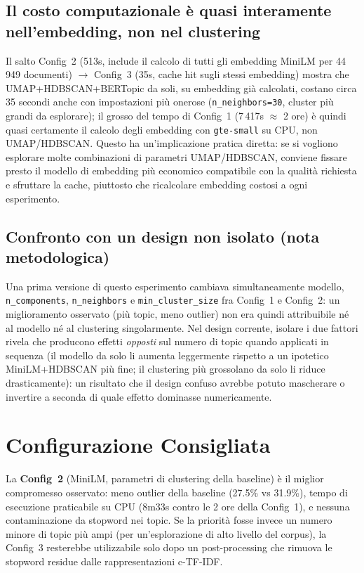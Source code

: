 \documentclass[12pt,a4paper]{article}
\begin{document}
\subsection{Il costo computazionale \`e quasi interamente nell'embedding, non nel clustering}

Il salto Config~2 (513s, include il calcolo di tutti gli embedding MiniLM per 44\,949 documenti) $\to$ Config~3 (35s, cache hit sugli stessi embedding) mostra che UMAP+HDBSCAN+BERTopic da soli, su embedding gi\`a calcolati, costano circa 35 secondi anche con impostazioni pi\`u onerose (\texttt{n\_neighbors=30}, cluster pi\`u grandi da esplorare); il grosso del tempo di Config~1 (7\,417s $\approx$ 2 ore) \`e quindi quasi certamente il calcolo degli embedding con \texttt{gte-small} su CPU, non UMAP/HDBSCAN. Questo ha un'implicazione pratica diretta: se si vogliono esplorare molte combinazioni di parametri UMAP/HDBSCAN, conviene fissare presto il modello di embedding pi\`u economico compatibile con la qualit\`a richiesta e sfruttare la cache, piuttosto che ricalcolare embedding costosi a ogni esperimento.

\subsection{Confronto con un design non isolato (nota metodologica)}

Una prima versione di questo esperimento cambiava simultaneamente modello, \texttt{n\_components}, \texttt{n\_neighbors} e \texttt{min\_cluster\_size} fra Config~1 e Config~2: un miglioramento osservato (pi\`u topic, meno outlier) non era quindi attribuibile n\'e al modello n\'e al clustering singolarmente. Nel design corrente, isolare i due fattori rivela che producono effetti \emph{opposti} sul numero di topic quando applicati in sequenza (il modello da solo li aumenta leggermente rispetto a un ipotetico MiniLM+HDBSCAN pi\`u fine; il clustering pi\`u grossolano da solo li riduce drasticamente): un risultato che il design confuso avrebbe potuto mascherare o invertire a seconda di quale effetto dominasse numericamente.

\section{Configurazione Consigliata}

La \textbf{Config~2} (MiniLM, parametri di clustering della baseline) \`e il miglior compromesso osservato: meno outlier della baseline (27.5\% vs 31.9\%), tempo di esecuzione praticabile su CPU (8m33s contro le 2 ore della Config~1), e nessuna contaminazione da stopword nei topic. Se la priorit\`a fosse invece un numero minore di topic pi\`u ampi (per un'esplorazione di alto livello del corpus), la Config~3 resterebbe utilizzabile solo dopo un post-processing che rimuova le stopword residue dalle rappresentazioni c-TF-IDF.
\end{document}
